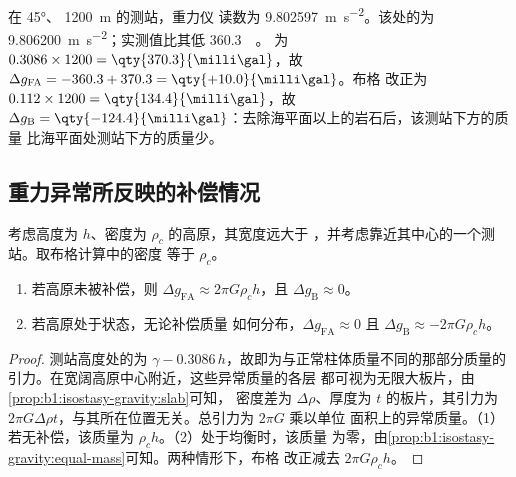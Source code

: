 \begin{example}[丘陵中的测站]\label{ex:b1:isostasy-gravity:reduction}
在 \ang{45}、 \qty{1200}{m} 的测站，重力仪
读数为 \qty{9.802597}{m.s^{-2}}。该处的为
\qty{9.806200}{m.s^{-2}}；实测值比其低 \qty{360.3}{\milli\gal}。
为 $0.3086\times1200 = \qty{370.3}{\milli\gal}$，故
$\Delta g_{\mathrm{FA}} = -360.3 + 370.3 = \qty{+10.0}{\milli\gal}$。布格
改正为 $0.112\times1200 = \qty{134.4}{\milli\gal}$，故 $\Delta g_{\mathrm B}
= \qty{-124.4}{\milli\gal}$：去除海平面以上的岩石后，该测站下方的质量
比海平面处测站下方的质量少。
\end{example}

\subsection*{重力异常所反映的补偿情况}

\begin{proposition}[大范围地形起伏上的异常]\label{prop:b1:isostasy-gravity:broad}
考虑高度为 $h$、密度为 $\rho_c$ 的高原，其宽度远大于
，并考虑靠近其中心的一个测站。取布格计算中的密度
等于 $\rho_c$。
\begin{enumerate}
  \item 若高原未被补偿，则 $\Delta g_{\mathrm{FA}} \approx
        2\pi G\rho_c h$，且 $\Delta g_{\mathrm B} \approx 0$。
  \item 若高原处于状态，无论补偿质量
        如何分布，$\Delta g_{\mathrm{FA}} \approx 0$ 且
        $\Delta g_{\mathrm B} \approx -2\pi G\rho_c h$。
\end{enumerate}
\end{proposition}

\begin{proof}
测站高度处的为 $\gamma - 0.3086\,h$，故即为与正常柱体质量不同的那部分质量的
引力。在宽阔高原中心附近，这些异常质量的各层
都可视为无限大板片，由\cref{prop:b1:isostasy-gravity:slab}可知，
密度差为 $\Delta\rho$、厚度为 $t$ 的板片，其引力为 $2\pi G\Delta\rho
t$，与其所在位置无关。总引力为 $2\pi G$ 乘以单位
面积上的异常质量。（1）若无补偿，该质量为 $\rho_c h$。（2）处于均衡时，该质量
为零，由\cref{prop:b1:isostasy-gravity:equal-mass}可知。两种情形下，布格
改正减去 $2\pi G\rho_c h$。
\end{proof}

